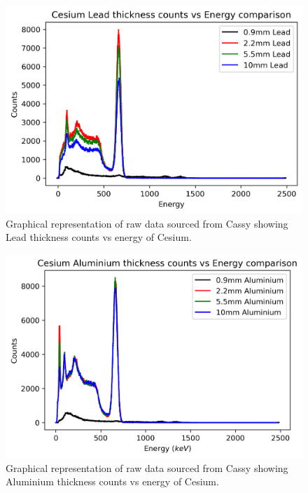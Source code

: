 \documentclass[12pt]{article}
\begin{document}
\begin{multicols}{2}
\begin{figure}[H]
\centering
\includegraphics[scale=0.6]{Images/CesiumLeadEnergyCounts.png}
\caption{Graphical representation of raw data sourced from Cassy showing Lead thickness counts vs energy of Cesium.}
\label{Cesium Lead Energy Counts}
\end{figure}

\begin{figure}[H]
\centering
\includegraphics[scale=0.6]{Images/CesiumAluminiumEnergyCounts.png}
\caption{Graphical representation of raw data sourced from Cassy showing Aluminium thickness counts vs energy of Cesium.}
\label{Cesium Alu Energy Counts}
\end{figure}
\end{multicols}
\end{document}
